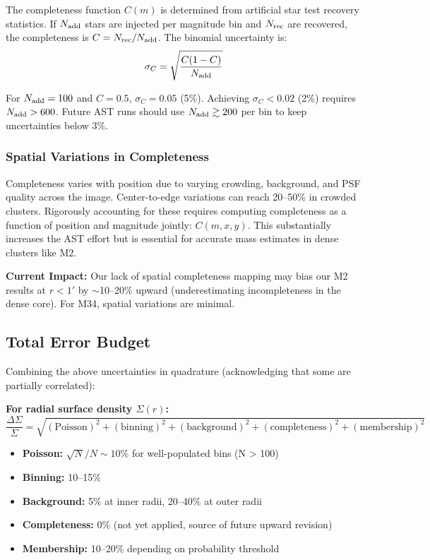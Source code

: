 \documentclass[linenumbers,trackchanges,twocolumn]{aastex701}
\begin{document}
The completeness function $C(m)$ is determined from artificial star test recovery statistics. If $N_{\rm add}$ stars are injected per magnitude bin and $N_{\rm rec}$ are recovered, the completeness is $C = N_{\rm rec} / N_{\rm add}$. The binomial uncertainty is:
\begin{equation}
\sigma_C = \sqrt{\frac{C(1-C)}{N_{\rm add}}}
\end{equation}

For $N_{\rm add} = 100$ and $C = 0.5$, $\sigma_C = 0.05$ (5\%). Achieving $\sigma_C < 0.02$ (2\%) requires $N_{\rm add} > 600$. Future AST runs should use $N_{\rm add} \gtrsim 200$ per bin to keep uncertainties below 3\%.

\subsubsection{Spatial Variations in Completeness}

Completeness varies with position due to varying crowding, background, and PSF quality across the image. Center-to-edge variations can reach 20--50\% in crowded clusters. Rigorously accounting for these requires computing completeness as a function of position and magnitude jointly: $C(m, x, y)$. This substantially increases the AST effort but is essential for accurate mass estimates in dense clusters like M2.

\textbf{Current Impact:} Our lack of spatial completeness mapping may bias our M2 results at $r < 1'$ by $\sim$10--20\% upward (underestimating incompleteness in the dense core). For M34, spatial variations are minimal.

\subsection{Total Error Budget}

Combining the above uncertainties in quadrature (acknowledging that some are partially correlated):

\textbf{For radial surface density $\Sigma(r)$:}
\begin{equation}
\frac{\Delta \Sigma}{\Sigma} = \sqrt{(\text{Poisson})^2 + (\text{binning})^2 + (\text{background})^2 + (\text{completeness})^2 + (\text{membership})^2}
\end{equation}

\begin{itemize}
\item \textbf{Poisson:} $\sqrt{N}/N \sim 10\%$ for well-populated bins (N > 100)
\item \textbf{Binning:} 10--15\%
\item \textbf{Background:} 5\% at inner radii, 20--40\% at outer radii
\item \textbf{Completeness:} 0\% (not yet applied, source of future upward revision)
\item \textbf{Membership:} 10--20\% depending on probability threshold
\end{itemize}
\end{document}
